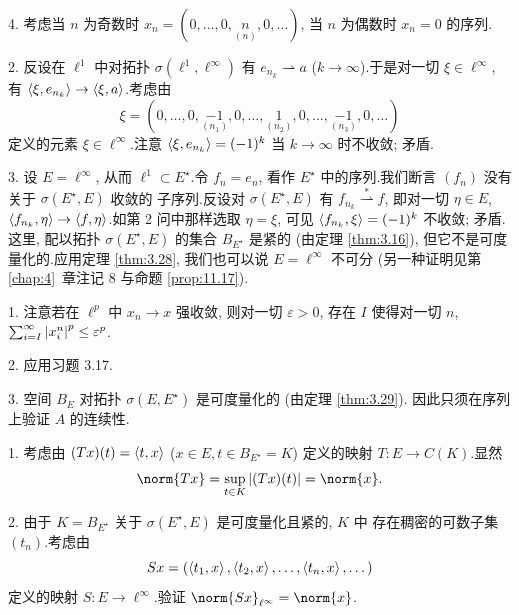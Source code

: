 4. 考虑当 $n$ 为奇数时 $x_n=(0,\dots,0,\underset{(n)}{n},0,\dots)$, 当
$n$ 为偶数时 $x_n=0$ 的序列.


2. 反设在 $\ell^1$ 中对拓扑 $\sigma(\ell^1,\ell^\infty)$ 有
$e_{n_k}\rightharpoonup a$ ($k\to\infty$).于是对一切 $\xi\in\ell^\infty$,
有 $\left\langle \xi,e_{n_k}\right\rangle\to\left\langle \xi,a\right\rangle$.考虑由
\begin{equation*}
\xi=(0,\dots,0,\underset{(n_1)}{-1},0,\dots,\underset{(n_2)}{1},0,\dots,\underset{(n_3)}{-1},0,\dots)
\end{equation*}
定义的元素 $\xi\in\ell^\infty$.注意 $\left\langle \xi,e_{n_k}\right\rangle=(-1)^k$ 当
$k\to\infty$ 时不收敛; 矛盾.

3. 设 $E=\ell^\infty$, 从而 $\ell^1\subset E^\star$.令 $f_n=e_n$, 看作
$E^\star$ 中的序列.我们断言 $(f_n)$ 没有关于 $\sigma(E^\star,E)$ 收敛的
子序列.反设对 $\sigma(E^\star,E)$ 有
$f_{n_k}\overset{*}{\rightharpoonup}f$, 即对一切 $\eta\in E$,
$\left\langle f_{n_k},\eta\right\rangle\to\left\langle f,\eta\right\rangle$.如第 2 问中那样选取 $\eta=\xi$,
可见 $\left\langle f_{n_k},\xi\right\rangle=(-1)^k$ 不收敛; 矛盾.这里, 配以拓扑
$\sigma(E^\star,E)$ 的集合 $B_{E^\star}$ 是紧的 (由定理  \ref{thm:3.16}),
但它不是可度量化的.应用定理  \ref{thm:3.28}, 我们也可以说 $E=\ell^\infty$
不可分 (另一种证明见第~
\ref{chap:4}~章注记 8 与命题  \ref{prop:11.17}).


1. 注意若在 $\ell^p$ 中 $x_n\to x$ 强收敛, 则对一切 $\varepsilon>0$, 存在
$I$ 使得对一切 $n$, $\sum_{i=I}^\infty\left|x_i^n\right|^p\le\varepsilon^p$.

2. 应用习题 3.17.

3. 空间 $B_E$ 对拓扑 $\sigma(E,E^\star)$ 是可度量化的 (由定理  \ref{thm:3.29}).
因此只须在序列上验证 $A$ 的连续性.


1. 考虑由 $(Tx)(t)=\left\langle t,x\right\rangle$ ($x\in E,t\in B_{E^\star}=K$) 定义的映射
$T:E\to C(K)$.显然
\begin{equation*}
\norm{Tx}=\sup_{t\in K}\abs{(Tx)(t)}=\norm{x}.
\end{equation*}

2. 由于 $K=B_{E^\star}$ 关于 $\sigma(E^\star,E)$ 是可度量化且紧的, $K$ 中
存在稠密的可数子集 $(t_n)$.考虑由
\begin{equation*}
Sx=(\left\langle t_1,x\right\rangle,\left\langle t_2,x\right\rangle,\dots,\left\langle t_n,x\right\rangle,\dots)
\end{equation*}
定义的映射 $S:E\to\ell^\infty$.验证 $\norm{Sx}_{\ell^\infty}=\norm{x}$.


